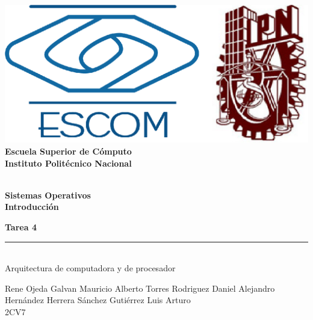 
\begin{titlepage} %

    \begin{flushright}

	   \includegraphics[scale=0.15]{imagenes/escom-ipn.png}
	   \large \textbf{\\Escuela Superior de C\'omputo}
	   \large \textbf{\\Instituto Polit\'ecnico Nacional }%

	   \vspace{2.5cm} %

	   \large \textbf{\\Sistemas Operativos}%
	   \large \textbf{\\Introducción}%

	   \vspace{1.2cm} %

	   \large \textbf{Tarea 4}\\%
	   \rule{5cm}{3pt} %
	   \large{\\ Arquitectura de computadora y de procesador} %

	   \vspace{2.5cm} %

	   Rene Ojeda Galvan
	   Mauricio Alberto Torres Rodriguez
	   Daniel Alejandro Hernández Herrera 
	   Sánchez Gutiérrez Luis Arturo\\ %
	   2CV7 %

	   \vspace{2.5cm} %

	   \date{\today}

    \end{flushright}

\end{titlepage}
